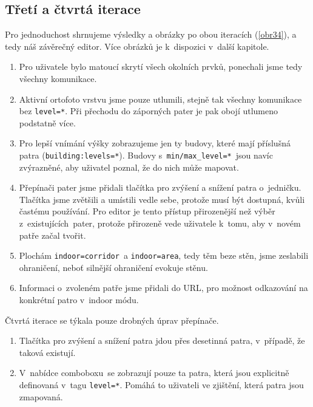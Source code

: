 \subsection{Třetí a čtvrtá iterace}\label{tux159etuxed-a-ux10dtvrtuxe1-iterace}

Pro jednoduchost shrnujeme výsledky a obrázky po obou iteracích (\ref{obr34}), a tedy náš závěrečný editor. Více obrázků je k~dispozici v~další kapitole.

\begin{enumerate}

\item
  Pro uživatele bylo matoucí skrytí všech okolních prvků, ponechali jsme tedy všechny komunikace.
\item
  Aktivní ortofoto vrstvu jsme pouze utlumili, stejně tak všechny komunikace bez \texttt{level=*}. Při přechodu do záporných pater je pak obojí utlumeno podstatně více.
\item
  Pro lepší vnímání výšky zobrazujeme jen ty budovy, které mají příslušná patra (\texttt{building:levels=*}). Budovy s~\texttt{min/max\_level=*}~jsou navíc zvýrazněné, aby uživatel poznal, že do nich může mapovat.
\item
  Přepínači pater jsme přidali tlačítka pro zvýšení a snížení patra o~jedničku. Tlačítka jsme zvětšili a umístili vedle sebe, protože musí být dostupná, kvůli častému používání. Pro editor je tento přístup přirozenější než výběr z~existujících~pater, protože přirozeně vede uživatele k~tomu, aby v~novém patře začal tvořit.
\item
  Plochám \texttt{indoor=corridor}~a \texttt{indoor=area}, tedy těm beze stěn, jsme zeslabili ohraničení, neboť silnější ohraničení evokuje stěnu.
\item
  Informaci o~zvoleném patře jsme přidali do URL, pro možnost odkazování na konkrétní patro v~indoor módu.
\end{enumerate}

Čtvrtá iterace se týkala pouze drobných úprav přepínače.

\begin{enumerate}

\item
  Tlačítka pro zvýšení a snížení patra jdou přes desetinná patra, v~případě, že taková existují.
\item
  V~nabídce comboboxu~se zobrazují pouze ta patra, která jsou explicitně definovaná v~tagu \texttt{level=*}. Pomáhá to uživateli ve zjištění, která patra jsou zmapovaná.
\end{enumerate}

